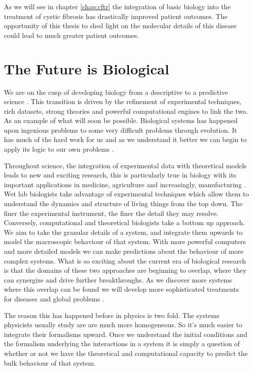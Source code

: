 As we will see in chapter \ref{chap:cftr} the integration of basic biology into the treatment of cystic fibrosis has drastically improved patient outcomes. The opportunity of this thesis to shed light on the molecular details of this disease could lead to much greater patient outcomes. 

\section{The Future is Biological}
We are on the cusp of developing biology from a descriptive to a predictive science \cite{kochanski1973,liu2005, mogilner2016, covert2021, jumper2021}. This transition is driven by the refinement of experimental techniques, rich datasets, strong theories and powerful computational engines to link the two. As an example of what will soon be possible. Biological systems has happened upon ingenious problems to some very difficult problems through evolution. It has much of the hard work for us and as we understand it better we can begin to apply its logic to our own problems \cite{benyus2009}.

Throughout science, the integration of experimental data with theoretical models leads to new and exciting research, this is particularly true in biology with its important applications in medicine, agriculture and increasingly, manufacturing \cite{anonymous2019, scown2022}. Wet lab biologists take advantage of experimental techniques which allow them to understand the dynamics and structure of living things from the top down. The finer the experimental instrument, the finer the detail they may resolve. Conversely, computational and theoretical biologists take a bottom up approach. We aim to take the granular details of a system, and integrate them upwards to model the macroscopic behaviour of that system. With more powerful computers and more detailed models we can make predictions about the behaviour of more complex systems. What is so exciting about the current era of biological research is that the domains of these two approaches are beginning to overlap, where they can synergize  and drive further breakthroughs. As we discover more systems where this overlap can be found we will develop more sophisticated treatments for diseases and global problems \cite{anonymous2019}.

The reason this has happened before in physics is two fold. The systems physicists usually study are are much more homogeneous. So it's much easier to integrate their formalisms upward. Once we understand the initial conditions and the formalism underlying the interactions in a system it is simply a question of whether or not we have the theoretical and computational capacity to predict the bulk behaviour of that system. 

